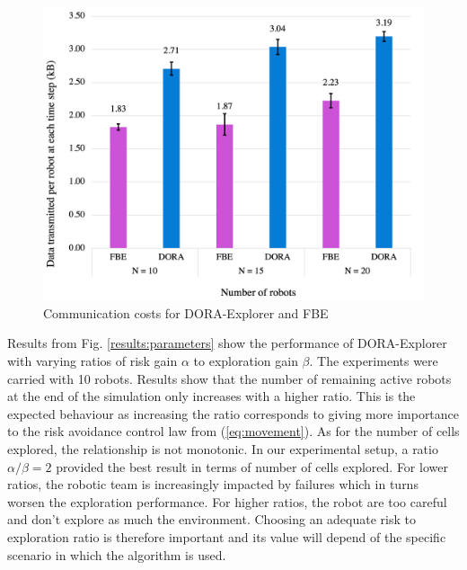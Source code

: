 \documentclass[letterpaper, 10 pt, conference]{ieeeconf}
\begin{document}
\begin{figure}[h]
    \centering
    \includegraphics[width=0.95\columnwidth]{images/communication.png}
    \caption{Communication costs for DORA-Explorer and FBE}
    \label{results:communicationCosts}
\end{figure}

Results from Fig. \ref{results:parameters} show the performance of DORA-Explorer with varying ratios of risk gain $\alpha$ to exploration gain $\beta$. The experiments were carried with 10 robots. Results show that the number of remaining active robots at the end of the simulation only increases with a higher ratio. This is the expected behaviour as increasing the ratio corresponds to giving more importance to the risk avoidance control law from (\ref{eq:movement}). As for the number of cells explored, the relationship is not monotonic. In our experimental setup, a ratio $\alpha / \beta = 2$ provided the best result in terms of number of cells explored. For lower ratios, the robotic team is increasingly impacted by failures which in turns worsen the exploration performance. For higher ratios, the robot are too careful and don't explore as much the environment. Choosing an adequate risk to exploration ratio is therefore important and its value will depend of the specific scenario in which the algorithm is used. 
\end{document}
